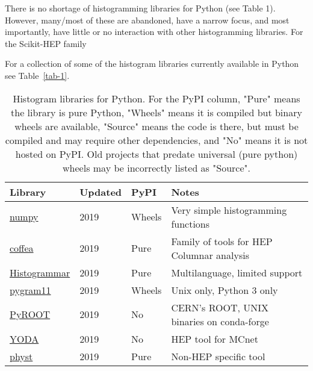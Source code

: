 \documentclass{webofc}
\begin{document}
There is no shortage of histogramming libraries for Python (see Table 1). However, many/most of these are abandoned, have a narrow focus, and most importantly, have little or no interaction with other histogramming libraries. For the Scikit-HEP family



For a collection of some of the histogram libraries currently available in Python see Table~\ref{tab-1}.

\begin{table}
	\centering
	\caption{Histogram libraries for Python. For the PyPI column, "Pure" means the library is pure Python, "Wheels" means it is compiled but binary wheels are available, "Source" means the code is there, but must be compiled and may require other dependencies, and "No" means it is not hosted on PyPI. Old projects that predate universal (pure python) wheels may be incorrectly listed as "Source".}
	\label{tab-libraries}       %
	\begin{tabular}{llll}
		\hline
		Library                                                                      & Updated & PyPI   & Notes                                                \\ \hline
		\href{https://www.numpy.org/}{numpy}                                         & 2019         & Wheels & Very simple histogramming functions                  \\
		\href{https://coffeateam.github.io/coffea/notebooks/histograms.html}{coffea} & 2019         & Pure   & Family of tools for HEP Columnar analysis            \\
		\href{https://histogrammar.org}{Histogrammar}                                & 2019         & Pure   & Multilanguage, limited support                       \\
		\href{https://pygram11.readthedocs.io}{pygram11}                             & 2019         & Wheels & Unix only, Python 3 only                             \\
		\href{https://root.cern.ch/pyroot}{PyROOT}                                   & 2019         & No     & CERN's ROOT, UNIX binaries on conda-forge            \\
		\href{https://yoda.hepforge.org}{YODA}                                       & 2019         & No     & HEP tool for MCnet                                   \\
		\href{https://physt.readthedocs.io/en/latest/tutorial.html}{physt}           & 2019         & Pure   & Non-HEP specific tool                                \\

\end{tabular}
\end{table}
\end{document}
